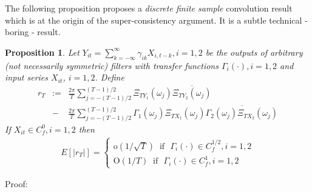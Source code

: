 \documentclass[11pt]{article}
\newtheorem{Proposition}{Proposition}
\begin{document}
\begin{appendix}
The following proposition proposes a \emph{discrete finite sample} convolution result which is at the origin of the super-consistency argument. It is a subtle technical - boring - result.
\begin{Proposition}\label{convolution theorem}
Let \(Y_{it}=\sum_{k=-\infty}^\infty \gamma_{ik} X_{i,t-k}, i=1,2\)
be the outputs of arbitrary (not necessarily symmetric) filters with
transfer functions \(\Gamma_i(\cdot), i=1,2\) and input series
$X_{it}$, $i=1,2$.  Define
\begin{eqnarray}\label{prop1085}
r_T&:=&\frac{2\pi}{T}\sum_{j=-(T-1)/2}^{(T-1)/2}\Xi_{TY_1}(\omega_j)\overline{\Xi_{TY_2}(\omega_j)}\nonumber\\
    &-& \frac{2\pi}{T}\sum_{j=-(T-1)/2}^{(T-1)/2}\Gamma_1(\omega_j)\Xi_{TX_1}(\omega_j)
    \overline{\Gamma_2(\omega_j)\Xi_{TX_2}(\omega_j)}
    \end{eqnarray}
    If $X_{it}\in C_f^0, i=1,2$ then
\begin{eqnarray}
E[|r_T|]=\left\{\begin{array}{cc}\textrm{o}(1/\sqrt{T})~\textrm{~if~~}\Gamma_i(\cdot)\in
C_f^{1/2},i=1,2\\
\textrm{O}(1/T)~\textrm{~if~~}\Gamma_i(\cdot)\in
C_f^{1},i=1,2\end{array}\right.
\end{eqnarray}
\end{Proposition}
Proof:\\


\end{appendix}
\end{document}
